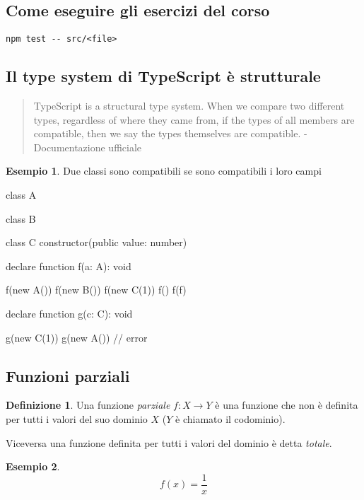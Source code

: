\documentclass[12pt]{article}
\theoremstyle{definition}
\newtheorem{definition}{Definizione}[section]
\newtheorem{example}{Esempio}[subsection]
\newenvironment{code}
  {\vspace{0.5cm} \VerbatimEnvironment\begin{typescriptcode}}
  {\end{typescriptcode} \vspace{0.2cm}}
\begin{document}
\subsection{Come eseguire gli esercizi del corso}

\begin{verbatim}
npm test -- src/<file>
\end{verbatim}

\subsection{Il type system di TypeScript è strutturale}

\begin{quote}
TypeScript is a structural type system. When we compare two different types, regardless of where they came from,
if the types of all members are compatible, then we say the types themselves are compatible. - Documentazione ufficiale
\end{quote}

\begin{example}
Due classi sono compatibili se sono compatibili i loro campi

\begin{code}
class A {}

class B {}

class C {
  constructor(public value: number) {}
}

declare function f(a: A): void

f(new A())
f(new B())
f(new C(1))
f({})
f(f)

declare function g(c: C): void

g(new C(1))
g(new A()) // error
\end{code}
\end{example}

\subsection{Funzioni parziali}

\begin{definition}
Una funzione \emph{parziale} $f: X \rightarrow Y$ è una funzione che non è definita per tutti i valori del suo dominio $X$
($Y$ è chiamato il codominio).
\end{definition}

Viceversa una funzione definita per tutti i valori del dominio è detta \emph{totale}.

\begin{example}
$$
f(x) = \frac{1}{x}
$$
\end{example}
\end{document}
